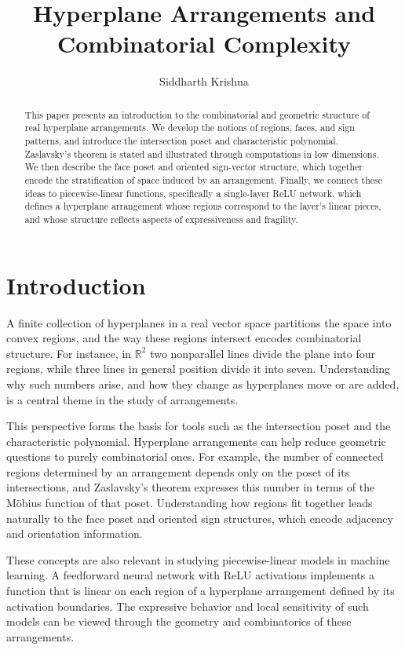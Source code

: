 \documentclass[12pt]{amsart}
\title{Hyperplane Arrangements and Combinatorial Complexity}
\author{Siddharth Krishna}
\theoremstyle{plain}
\theoremstyle{definition}
\theoremstyle{remark}
\newcommand{\R}{\mathbb{R}}
\begin{document}
\begin{abstract}
This paper presents an introduction to the combinatorial and geometric structure of real hyperplane arrangements. We develop the notions of regions, faces, and sign patterns, and introduce the intersection poset and characteristic polynomial. Zaslavsky's theorem is stated and illustrated through computations in low dimensions. We then describe the face poset and oriented sign-vector structure, which together encode the stratification of space induced by an arrangement. Finally, we connect these ideas to piecewise-linear functions, specifically a single-layer ReLU network, which defines a hyperplane arrangement whose regions correspond to the layer's linear pieces, and whose structure reflects aspects of expressiveness and fragility.
\end{abstract}

\maketitle

\section{Introduction}
A finite collection of hyperplanes in a real vector space partitions the space into convex regions, and the way these regions intersect encodes combinatorial structure. For instance, in $\R^2$ two nonparallel lines divide the plane into four regions, while three lines in general position divide it into seven. Understanding why such numbers arise, and how they change as hyperplanes move or are added, is a central theme in the study of arrangements.

This perspective forms the basis for tools such as the intersection poset and the characteristic polynomial. Hyperplane arrangements can help reduce geometric questions to purely combinatorial ones. For example, the number of connected regions determined by an arrangement depends only on the poset of its intersections, and Zaslavsky’s theorem expresses this number in terms of the M\"obius function of that poset. Understanding how regions fit together leads naturally to the face poset and oriented sign structures, which encode adjacency and orientation information.

These concepts are also relevant in studying piecewise-linear models in machine learning. A feedforward neural network with ReLU activations implements a function that is linear on each region of a hyperplane arrangement defined by its activation boundaries. The expressive behavior and local sensitivity of such models can be viewed through the geometry and combinatorics of these arrangements.
\end{document}
